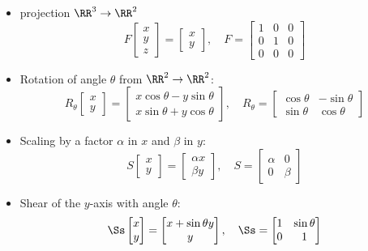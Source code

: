 \documentclass[8pt]{beamer}
\begin{document}
\begin{frame}
  \begin{itemize}
  \item projection $\RR^3\to\RR^2$
    $$
    F
    \begin{bmatrix}
      x \\y \\z
    \end{bmatrix}
    =
    \begin{bmatrix}
      x \\y
    \end{bmatrix},\quad F =
    \begin{bmatrix}
      1 & 0 & 0\\
      0 & 1 & 0\\
      0 & 0 & 0
    \end{bmatrix}
    $$
  \item Rotation of angle $\theta$ from $\RR^2\to\RR^2$:
    $$
    R_\theta
    \begin{bmatrix}
      x \\y
    \end{bmatrix}
    =
    \begin{bmatrix}
      x\cos\theta - y\sin\theta\\
      x\sin\theta + y\cos\theta
    \end{bmatrix},\quad
    R_\theta =
    \begin{bmatrix}
      \cos\theta & -\sin\theta\\
      \sin\theta & \cos\theta
    \end{bmatrix}
    $$
  \item Scaling by a factor $\alpha$ in $x$ and $\beta$ in $y$:
    $$
    S
    \begin{bmatrix}
     x\\y 
    \end{bmatrix}
    = 
    \begin{bmatrix}
      \alpha x\\
      \beta y
    \end{bmatrix},\quad
    S =
    \begin{bmatrix}
      \alpha & 0\\0 & \beta
    \end{bmatrix}
    $$
  \item Shear of the $y$-axis with  angle $\theta$:
    $$
    \Ss
    \begin{bmatrix}
      x\\y
    \end{bmatrix}
    =
    \begin{bmatrix}
      x + \sin\theta y\\
      y
    \end{bmatrix},\quad
    \Ss =
    \begin{bmatrix}
      1 &\sin\theta\\
      0 & 1
    \end{bmatrix}
    $$
  \end{itemize}
\end{frame}
\end{document}
